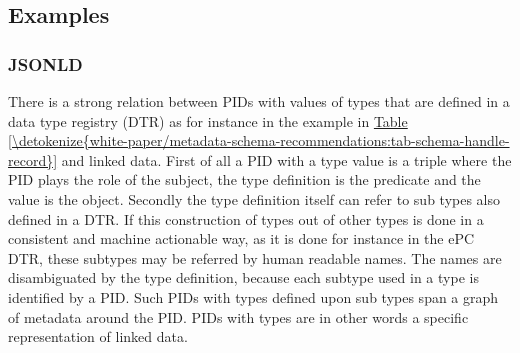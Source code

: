 \documentclass[a4paper,10pt,english]{sphinxmanual}
\begin{document}
\subsection{Examples}
\label{\detokenize{white-paper/landing-page-encoding:examples}}

\subsubsection{JSON\sphinxhyphen{}LD}
\label{\detokenize{white-paper/landing-page-encoding:json-ld}}
\sphinxAtStartPar
There is a strong relation between PIDs with values of types that are
defined in a data type registry (DTR) as for instance in the
example in \hyperref[\detokenize{white-paper/metadata-schema-recommendations:tab-schema-handle-record}]{Table \ref{\detokenize{white-paper/metadata-schema-recommendations:tab-schema-handle-record}}} and linked data. First
of all a PID with a type value is a triple where the PID plays the
role of the subject, the type definition is the predicate and the
value is the object. Secondly the type definition itself can refer to
sub types also defined in a DTR. If this construction of types out of
other types is done in a consistent and machine actionable way, as it
is done for instance in the ePC DTR, these subtypes may be referred by
human readable names. The names are disambiguated by the type
definition, because each subtype used in a type is identified by a
PID. Such PIDs with types defined upon sub types span a graph of
metadata around the PID. PIDs with types are in other words a specific
representation of linked data.
\end{document}
